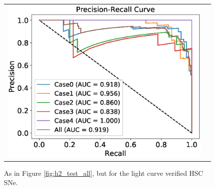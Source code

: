 \documentclass[useamsfonts]{pasj01}
\begin{document}
\begin{figure}[htbp]
\begin{tabular}{cc}
\begin{minipage}{0.5\hsize}
\begin{center}
                \includegraphics[width=\columnwidth]{figures/10_abs-mag_scaled-flux_w-mixup_remove-y_predictions_test_PreRec_noedge_spec.eps}
            \end{center}
        \end{minipage}
    \end{tabular}
    \vspace{2mm}
    \caption{%
  As in Figure \ref{fig:h2_test_all}, but for the light curve verified HSC SNe. 
}%
    \label{fig:h2_test_gold}
\end{figure}
%
%
\end{document}

